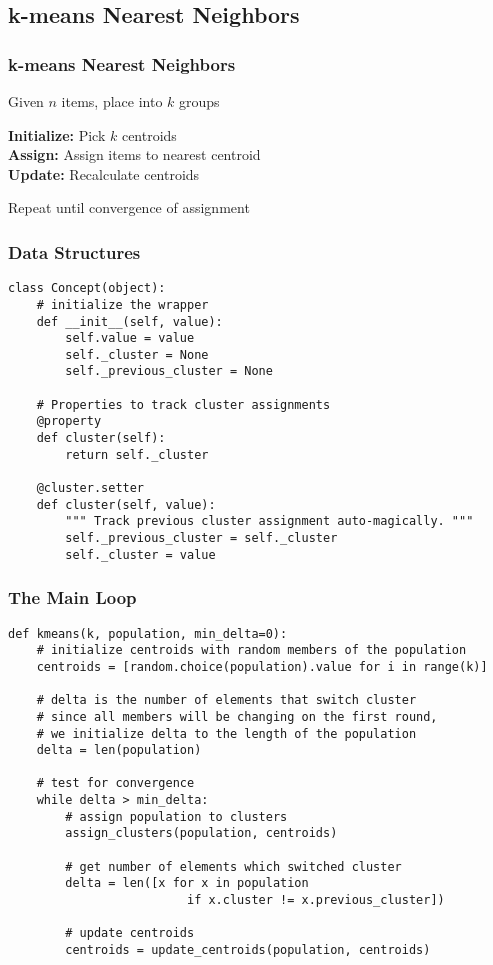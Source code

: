 \documentclass{beamer}
\begin{document}
\subsection{k-means Nearest Neighbors}
\begin{frame}
\frametitle{k-means Nearest Neighbors}
Given $n$ items, place into $k$ groups\\

\bigskip

\textbf{Initialize:} Pick $k$ centroids\\
\textbf{Assign:} Assign items to nearest centroid\\
\textbf{Update:} Recalculate centroids\\

\bigskip

Repeat until convergence of assignment

\end{frame}

\begin{frame}[fragile]
\frametitle{Data Structures}
\begin{verbatim}
class Concept(object):
    # initialize the wrapper
    def __init__(self, value):
        self.value = value
        self._cluster = None
        self._previous_cluster = None

    # Properties to track cluster assignments
    @property
    def cluster(self):
        return self._cluster
        
    @cluster.setter
    def cluster(self, value):
        """ Track previous cluster assignment auto-magically. """
        self._previous_cluster = self._cluster
        self._cluster = value
\end{verbatim}
\end{frame}

\begin{frame}[fragile]
\frametitle{The Main Loop}
\begin{verbatim}
def kmeans(k, population, min_delta=0):
    # initialize centroids with random members of the population
    centroids = [random.choice(population).value for i in range(k)]
   
    # delta is the number of elements that switch cluster
    # since all members will be changing on the first round,
    # we initialize delta to the length of the population
    delta = len(population)

    # test for convergence
    while delta > min_delta:
        # assign population to clusters
        assign_clusters(population, centroids)
        
        # get number of elements which switched cluster
        delta = len([x for x in population 
                         if x.cluster != x.previous_cluster])

        # update centroids
        centroids = update_centroids(population, centroids)
\end{verbatim}
\end{frame}
\end{document}
